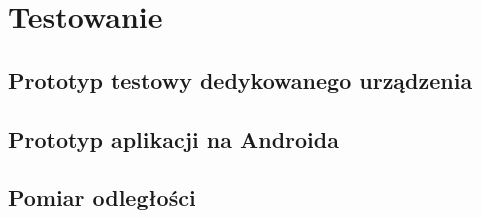 \newpage %
\section{Testowanie}
\subsection{Prototyp testowy dedykowanego urządzenia}
\subsection{Prototyp aplikacji na Androida}
\subsection{Pomiar odległości}